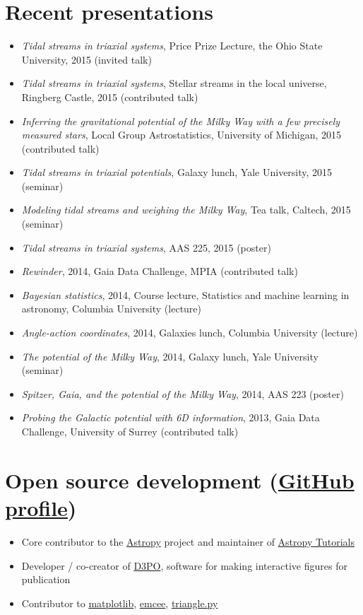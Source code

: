 \documentclass[12pt,letterpaper]{article}
\begin{document}
\section*{Recent presentations}

\begin{itemize}
	\item \emph{Tidal streams in triaxial systems}, Price Prize Lecture, the Ohio State University, 2015 (invited talk)
	\item \emph{Tidal streams in triaxial systems}, Stellar streams in the local universe, Ringberg Castle, 2015 (contributed talk)
        \item \emph{Inferring the gravitational potential of the Milky Way with a few precisely measured stars}, Local Group Astrostatistics, University of Michigan, 2015 (contributed talk)
        \item \emph{Tidal streams in triaxial potentials}, Galaxy lunch, Yale University, 2015 (seminar)
	\item \emph{Modeling tidal streams and weighing the Milky Way}, Tea talk, Caltech, 2015 (seminar)
	\item \emph{Tidal streams in triaxial systems}, AAS 225, 2015 (poster)
	\item \emph{Rewinder}, 2014, Gaia Data Challenge, MPIA (contributed talk)
	\item \emph{Bayesian statistics}, 2014, Course lecture, Statistics and machine learning in astronomy, Columbia University (lecture)
	\item \emph{Angle-action coordinates}, 2014, Galaxies lunch, Columbia University (lecture)
	\item \emph{The potential of the Milky Way}, 2014, Galaxy lunch, Yale University (seminar)
	\item \emph{Spitzer, Gaia, and the potential of the Milky Way}, 2014, AAS 223 (poster)
	\item \emph{Probing the Galactic potential with 6D information}, 2013, Gaia Data Challenge, University of Surrey (contributed talk)

\end{itemize}


\section*{Open source development (\href{https://github.com/adrn}{GitHub profile})}

\begin{itemize}

	\item Core contributor to the \href{http://www.astropy.org/}{Astropy} project and maintainer of \href{http://tutorials.astropy.org/}{Astropy Tutorials}
	\item Developer / co-creator of \href{http://d3po.org}{D3PO}, software for making interactive figures for publication
	\item Contributor to \href{http://matplotlib.org/}{matplotlib}, \href{http://dan.iel.fm/emcee/current/}{emcee}, \href{https://github.com/dfm/triangle.py}{triangle.py}

\end{itemize}
\end{document}
